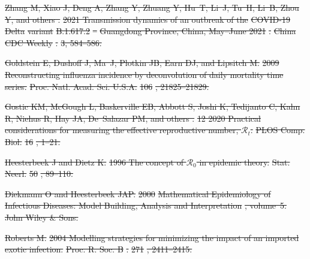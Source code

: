 \documentclass[12pt]{article}
\providecommand{\DIFdeltex}[1]{{\protect\color{red}\sout{#1}}}                      %
\providecommand{\DIFdel}[1]{\texorpdfstring{\DIFdeltex{#1}}{}} %
\begin{document}
\DIFdel{Zhang M, Xiao J, Deng A, Zhang Y, Zhuang Y, Hu~T, Li~J, Tu~H, Li~B, Zhou Y, and
  others .
}%
\DIFdel{2021 Transmission dynamics of an outbreak of the }%
\DIFdel{COVID-19}%
\DIFdel{Delta}%
\DIFdel{variant }%
\DIFdel{B.1.617.2}%
\DIFdel{--}%
\DIFdel{Guangdong Province, China, May--June 2021}%
\DIFdel{.
}%
\DIFdel{China CDC Weekly}%
\DIFdel{.
}%
\DIFdel{3, 584--586.
}%

\DIFdel{Goldstein E, Dushoff J, Ma~J, Plotkin JB, Earn DJ, and Lipsitch M.
}%
\DIFdel{2009 Reconstructing influenza incidence by deconvolution of daily
  mortality time series.
}%
\DIFdel{Proc. Natl. Acad. Sci. U.S.A.}%
\DIFdel{106}%
\DIFdel{, 21825--21829.
}%

\DIFdel{Gostic KM, McGough L, Baskerville EB, Abbott S, Joshi K, Tedijanto C, Kahn R,
  Niehus R, Hay JA, De~Salazar PM, and others .
}%
\DIFdel{12 2020 Practical considerations for measuring the effective
  reproductive number, $\mathcal{R}_t$.
}%
\DIFdel{PLOS Comp. Biol.}%
\DIFdel{16}%
\DIFdel{, 1--21.
}%

\DIFdel{Heesterbeek J and Dietz K.
}%
\DIFdel{1996 The concept of $\mathcal{R}_0$ in epidemic theory.
}%
\DIFdel{Stat. Neerl.}%
\DIFdel{50}%
\DIFdel{, 89--110.
}%

\DIFdel{Diekmann O and Heesterbeek JAP.
}%
\DIFdel{2000 }%
\DIFdel{Mathematical Epidemiology of Infectious Diseases: Model
  Building, Analysis and Interpretation}%
\DIFdel{, volume~5.
}%
\DIFdel{John Wiley \& Sons.
}%

\DIFdel{Roberts M.
}%
\DIFdel{2004 Modelling strategies for minimizing the impact of an imported
  exotic infection.
}%
\DIFdel{Proc. R. Soc. B}%
\DIFdel{.
}%
\DIFdel{271}%
\DIFdel{, 2411--2415.
}%
\end{document}
